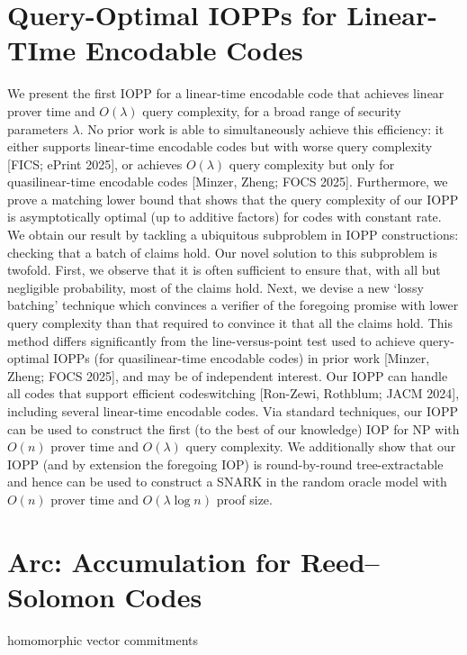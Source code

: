 \documentclass[11pt]{article}
\theoremstyle{definition}
\theoremstyle{remark}
\theoremstyle{plain}
\begin{document}
\section{\cite{cryptoeprint:2025/1588} Query-Optimal IOPPs for Linear-TIme Encodable Codes}
We present the first IOPP for a linear-time encodable code that achieves linear prover time and $O(\lambda)$ query complexity, for a broad range of security parameters $\lambda$. No prior work is able to simultaneously achieve this efficiency: it either supports linear-time encodable codes but with worse query complexity [FICS; ePrint 2025], or achieves $O(\lambda)$ query complexity but only for quasilinear-time encodable codes [Minzer, Zheng; FOCS 2025]. Furthermore, we prove a matching lower bound that shows that the query complexity of our IOPP is asymptotically optimal (up to additive factors) for codes with constant rate. We obtain our result by tackling a ubiquitous subproblem in IOPP constructions: checking that a batch of claims hold. Our novel solution to this subproblem is twofold. First, we observe that it is often sufficient to ensure that, with all but negligible probability, most of the claims hold. Next, we devise a new `lossy batching' technique which convinces a verifier of the foregoing promise with lower query complexity than that required to convince it that all the claims hold. This method differs significantly from the line-versus-point test used to achieve query-optimal IOPPs (for quasilinear-time encodable codes) in prior work [Minzer, Zheng; FOCS 2025], and may be of independent interest. Our IOPP can handle all codes that support efficient codeswitching [Ron-Zewi, Rothblum; JACM 2024], including several linear-time encodable codes. Via standard techniques, our IOPP can be used to construct the first (to the best of our knowledge) IOP for NP with $O(n)$ prover time and $O(\lambda)$ query complexity. We additionally show that our IOPP (and by extension the foregoing IOP) is round-by-round tree-extractable and hence can be used to construct a SNARK in the random oracle model with $O(n)$ prover time and $O(\lambda \log n)$ proof size.

\section{\cite{cryptoeprint:2024/1731} Arc: Accumulation for Reed--Solomon Codes}

homomorphic vector commitments

\cite{cryptoeprint:2024/474} 

%
%
\printbibliography
\end{document}
